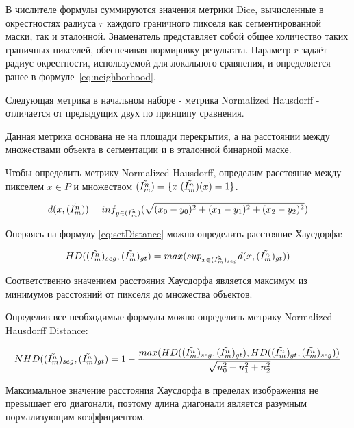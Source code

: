 В числителе формулы суммируются значения метрики Dice, вычисленные в окрестностях радиуса \(r\)  каждого граничного пикселя как сегментированной маски, так и эталонной. Знаменатель представляет собой общее количество таких граничных пикселей, обеспечивая нормировку результата. Параметр \(r\) задаёт радиус окрестности, используемой для локального сравнения, и определяется ранее в формуле~\eqref{eq:neighborhood}.

Следующая метрика в начальном наборе - метрика Normalized Hausdorff - отличается от предыдущих двух по принципу сравнения.

Данная метрика основана не на площади перекрытия, а на расстоянии между множествами объекта в сегментации и в эталонной бинарной маске. 

Чтобы определить метрику Normalized Hausdorff, определим расстояние между пикселем \(x \in P\) и множеством \((\tilde{I^n_m}) = \{x | (\tilde{I^n_m})(x) = 1\}\).

\begin{equation}\label{eq:setDistance}
    d(x,(\tilde{I^n_m})) = inf_{y\in (\tilde{I^n_m})} (\sqrt{(x_0 - y_0)^2 + (x_1 - y_1)^2 + (x_2 - y_2)^2})
\end{equation}

Операясь на формулу \ref{eq:setDistance} можно определить расстояние Хаусдорфа:

\begin{equation}\label{eq:HausdorffDistance}
    HD((\tilde{I^n_m})_{seg}, (\tilde{I^n_m})_{gt}) = max(sup_{x \in (\tilde{I^n_m})_{seg}}d(x, (\tilde{I^n_m})_{gt}))
\end{equation}

Соответственно значением расстояния Хаусдорфа является максимум из минимумов расстояний от пикселя до множества объектов.

Определив все необходимые формулы можно определить метрику Normalized Hausdorff Distance:

\begin{equation}\label{eq:NormalizedHausdorffDistance}
    NHD((\tilde{I^n_m})_{seg}, (\tilde{I^n_m})_{gt}) = 1 - \frac{max(HD((\tilde{I^n_m})_{seg}, (\tilde{I^n_m})_{gt}), HD((\tilde{I^n_m})_{gt}, (\tilde{I^n_m})_{seg}))}{\sqrt{n_0^2 + n_1^2 + n_2^2}}
\end{equation}

Максимальное значение расстояния Хаусдорфа в пределах изображения не превышает его диагонали, поэтому длина диагонали является разумным нормализующим коэффициентом.

